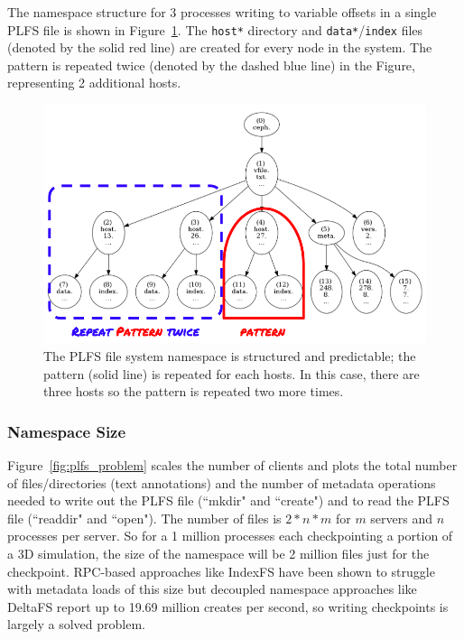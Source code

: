 The namespace structure for 3 processes writing to variable offsets in a single
PLFS file is shown in Figure~\ref{fig:tree_plfs}. The \texttt{host*} directory
and \texttt{data*}/\texttt{index} files (denoted by the solid red line) are
created for every node in the system. The pattern is repeated twice (denoted by
the dashed blue line) in the Figure, representing 2 additional hosts.

\begin{figure}[tb]
\centering
  \includegraphics[width=1\linewidth]{figures/tree_plfs.png} 
  \caption{The PLFS file system namespace is structured and predictable; the
  pattern (solid line) is repeated for each hosts. In this case, there are three
  hosts so the pattern is repeated two more times. 
  }\label{fig:tree_plfs}
\end{figure}

\subsubsection{Namespace Size}

Figure~\ref{fig:plfs_problem} scales the number of clients and plots the total
number of files/directories (text annotations) and the number of metadata
operations needed to write out the PLFS file (``mkdir" and ``create") and to
read the PLFS file (``readdir" and ``open"). The number of files is \(2*n*m\)
for \(m\) servers and \(n\) processes per server. So for a 1 million processes
each checkpointing a portion of a 3D simulation, the size of the namespace will
be 2 million files just for the checkpoint. RPC-based approaches like IndexFS
have been shown to struggle with metadata loads of this size but decoupled
namespace approaches like DeltaFS report up to 19.69 million creates per
second, so writing checkpoints is largely a solved problem.

